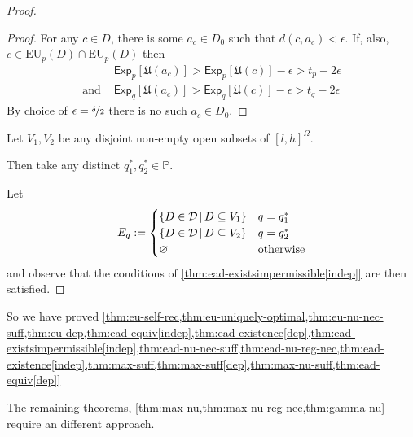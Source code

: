 \documentclass[a4paper]{article}
\newcommand\A{\mathcal{A}}
\renewcommand\P{\mathbb{P}} %
\newcommand\Exp{\mathsf{Exp}}
\newcommand\EU{\mathrm{EU}}
\newcommand\U{\mathfrak{U}} %
\newcommand{\Decs}{\mathcal{D}}
\newcommand{\IP}{\P}
\newcommand\SetDelimiter[1][]{
	\nonscript\,#1\vert \allowbreak \nonscript\,\mathopen{}}
\providecommand\given{\SetDelimiter}
\renewcommand{\emptyset}{\varnothing}
\renewcommand{\leq}{\leqslant}
\newenvironment{CCM rewritten}
{\begingroup\color{blue}} %
{\endgroup}              %
\begin{document}
\begin{proof}
\begin{proof}
		For any $c\in D$, there is some $a_c\in D_0$ such that $d(c,a_c)<\epsilon$. If, also,  $c\in \EU_{p}(D)\cap\EU_{p}(D)$ then 
		\begin{align}
			&\Exp_{p}[\U(a_c)]>\Exp_{p}[\U(c)]-\epsilon>t_p-2\epsilon\\
			\text{and }&\Exp_{q}[\U(a_c)]>\Exp_{q}[\U(c)]-\epsilon>t_q-2\epsilon
		\end{align}
		By choice of $\epsilon=\nicefrac{\delta}{2}$ there is no such $a_c\in D_0$. 
	\end{proof}
	
	Let $V_1,V_2$ be any disjoint non-empty open subsets of $[l,h]^\Omega$. 
	
	Then take any distinct $q^*_1,q^*_2\in\IP$. 
	
	Let $$E_q:=\begin{cases}
		\{D\in\Decs\given D\subseteq V_1\}&q=q^*_1\\
			\{D\in\Decs\given D\subseteq V_2\}&q=q^*_2\\
		\emptyset&\text{otherwise}
	\end{cases}$$
	and observe that the conditions of \cref{thm:ead-existsimpermissible[indep]} are then satisfied. 
\end{proof}




So we have proved \cref{thm:eu-self-rec,thm:eu-uniquely-optimal,thm:eu-nu-nec-suff,thm:eu-dep,thm:ead-equiv[indep],thm:ead-existence[dep],thm:ead-existsimpermissible[indep],thm:ead-nu-nec-suff,thm:ead-nu-reg-nec,thm:ead-existence[indep],thm:max-suff,thm:max-suff[dep],thm:max-nu-suff,thm:ead-equiv[dep]}

The remaining theorems, \cref{thm:max-nu,thm:max-nu-reg-nec,thm:gamma-nu} require an different approach.
\end{document}
